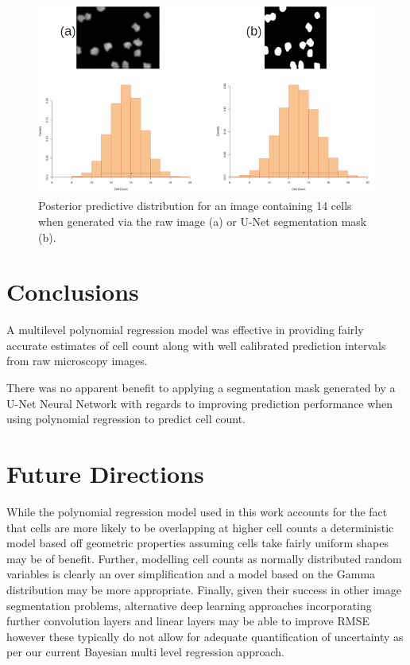 \documentclass[isoft]{poster_class_UofC}
\begin{document}
\begin{poster}
             \vspace{1cm}
           \begin{figure}
            \centering
            \captionsetup{type=figure}
            \includegraphics[scale=2]{./images/PostPredDist.png}
            \caption{Posterior predictive distribution for an image containing 14 cells when generated via the raw image (a) or U-Net segmentation mask (b).}
            \label{fig:PostPredDist}
        \end{figure}   
            \vspace{1cm}
            
    
        \section{Conclusions}
A multilevel polynomial regression model was effective in providing fairly accurate estimates of cell count along with well calibrated prediction intervals from raw microscopy images.

There was no apparent benefit to applying a segmentation mask generated by a U-Net Neural Network with regards to improving prediction performance when using polynomial regression to predict cell count.


        \section{Future Directions}
While the polynomial regression model used in this work accounts for the fact that cells are more likely to be overlapping at higher cell counts a deterministic model based off geometric properties assuming cells take fairly uniform shapes may be of benefit.  Further, modelling cell counts as normally distributed random variables is clearly an over simplification and a model based on the Gamma distribution may be more appropriate.  Finally, given their success in other image segmentation problems, alternative deep learning approaches incorporating further convolution layers and linear layers may be able to improve RMSE however these typically do not allow for adequate quantification of uncertainty as per our current Bayesian multi level regression approach. 
    

\end{poster}
\end{document}
